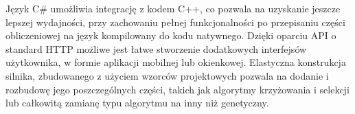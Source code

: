 Język C\# umożliwia integrację z kodem C++, co pozwala na uzyskanie jeszcze lepszej wydajności, przy zachowaniu pełnej funkcjonalności po przepisaniu części obliczeniowej na język kompilowany do kodu natywnego.
Dzięki oparciu API o standard HTTP możliwe jest łatwe stworzenie dodatkowych interfejsów użytkownika, w formie aplikacji mobilnej lub okienkowej.
Elastyczna konstrukcja silnika, zbudowanego z użyciem wzorców projektowych pozwala na dodanie i rozbudowę jego poszczególnych części, takich jak algorytmy krzyżowania i selekcji lub całkowitą zamianę typu algorytmu na inny niż genetyczny.